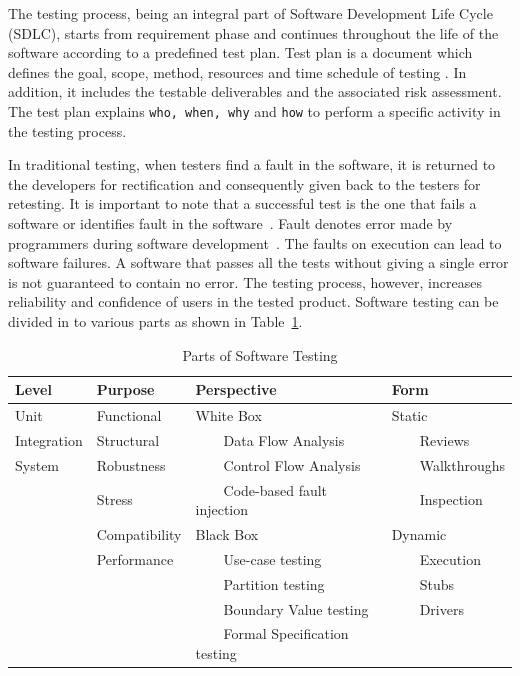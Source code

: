 The testing process, being an integral part of Software Development Life Cycle (SDLC), starts from requirement phase and continues throughout the life of the software according to a predefined test plan. Test plan is a document which defines the goal, scope, method, resources and time schedule of testing \cite{futrell2001quality}. In addition, it includes the testable deliverables and the associated risk assessment. The test plan explains \verb+who, when, why+ and \verb+how+ to perform a specific activity in the testing process. 

In traditional testing, when testers find a fault in the software, it is returned to the developers for rectification and consequently given back to the testers for retesting. It is important to note that a successful test is the one that fails a software or identifies fault in the software~\cite{myers2011art}. Fault denotes error made by programmers during software development~\cite{american1984}. The faults on execution can lead to software failures. A software that passes all the tests without giving a single error is not guaranteed to contain no error. The testing process, however, increases reliability and confidence of users in the tested product. Software testing can be divided in to various parts as shown in Table~\ref{table:softwareTestingParts}.


\begin{table}[ht]
\caption{Parts of Software Testing} %
\bigskip
\centering %
{\renewcommand{\arraystretch}{1.5} %
\begin{tabular}{| l | l | l | l | } %
\hline

Level 					&Purpose		 		& Perspective					& Form 					\\
\hline
Unit						& Functional			& White Box							& Static 					\\
Integration				& Structural			& ~~~~Data Flow Analysis				& ~~~~Reviews			\\
System					& Robustness		& ~~~~Control Flow Analysis			& ~~~~Walkthroughs		\\
						& Stress				& ~~~~Code-based fault injection 		& ~~~~Inspection		\\
						& Compatibility		& Black Box							& Dynamic				\\
						& Performance		& ~~~~Use-case testing				& ~~~~Execution			\\
						&					& ~~~~Partition testing				& ~~~~Stubs				\\
						&					& ~~~~Boundary Value testing			& ~~~~Drivers			\\
						&					& ~~~~Formal Specification testing		&						\\



\hline %
\end{tabular}
}
\bigskip
\label{table:softwareTestingParts} %
\end{table}



